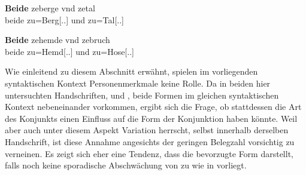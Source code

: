 \begin{exe}
\ex \label{ex:syntintvar2}
\begin{xlist}
	\ex \label{ex:syntintvar2_1}
		\begin{taggedline}{\parencites[\pno~21\rc, 30]{kc:B1}[zu][\pno~7572--7583]{schroeder1895}}
		\end{taggedline}

	\ex \label{ex:syntintvar2_3}
		\begin{taggedline}{\parencites[\pno~36\vb, 13]{kc:VB}[zu][\pno~7572--7583]{schroeder1895}}
		\end{taggedline}
\end{xlist}

\ex \label{ex:syntintvar5}
\begin{xlist}
	\ex \label{ex:syntintvar2_2}
		\begin{taggedline}{\parencites[\pno~32\rb, 35]{kc:B1}[zu][11610\psqq]{schroeder1895}}
		\end{taggedline}

	\ex \label{ex:syntintvar2_4}
		\gll \textbf{Beide} zeberge vnd zetal \\
			beide zu=Berg[\Dat.\Sg.\MascI] und zu=Tal[\Dat.\Sg.\NeutI] \\
		\begin{taggedline}{\parencites[\pno~83\vb, 3]{kc:VB}[zu][11610\psqq]{schroeder1895}}
		\trans {}
		\end{taggedline}
\end{xlist}

\ex \label{ex:syntintvar4}
	\gll \textbf{Beide} zehemde vnd zebruch \\
		beide zu=Hemd[\Dat.\Sg.\NeutI] und zu=Hose[\Dat.\Sg.\FemI] \\
	\begin{taggedline}{\parencites[\pno~99\rb, 21]{kc:VB}[vgl.~abweichend][\pno~14799]{schroeder1895}}
	\trans {}
	\end{taggedline}
\end{exe}

Wie einleitend zu diesem Abschnitt erwähnt, spielen im vorliegenden
syntaktischen Kontext Personenmerkmale keine Rolle. Da in beiden hier
untersuchten Handschriften, \citet{kc:B1} und \citet{kc:VB}, beide Formen im
gleichen syntaktischen Kontext nebeneinander vorkommen, ergibt sich die Frage,
ob stattdessen die Art des Konjunkts einen Einfluss auf die Form der
Konjunktion haben könnte. Weil aber auch unter diesem Aspekt Variation
herrscht, selbst innerhalb derselben Handschrift, ist diese Annahme angesichts
der geringen Belegzahl vorsichtig zu verneinen. Es zeigt sich eher eine
Tendenz, dass  die bevorzugte Form darstellt, falls noch keine
sporadische Abschwächung von  zu  wie in \citet{kc:VB}
vorliegt.

